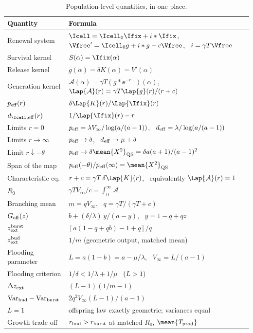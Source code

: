 \begin{table}[htbp]
\centering
\renewcommand{\arraystretch}{1.1}
\small
\begin{tabular}{@{}p{}p{}@{}}
\toprule
Quantity & Formula \\
\midrule
Renewal system & $\Icell=\Icell_0\Ifix+i*\Ifix$, \ $\Vfree'=\Icell_0 g+i*g-c\Vfree$, \ $i=\gamma T\Vfree$ \\
Survival kernel & $S(\alpha)=\Ifix(\alpha)$ \\
Release kernel & $g(\alpha)=\delta K(\alpha)=V'(\alpha)$ \\
Generation kernel & $\mathcal A(\alpha)=\gamma T(g*\ee^{-c\,\cdot})(\alpha)$, \ $\Lap{\mathcal A}(r)=\gamma T\Lap{g}(r)/(r+c)$ \\
$p_{\rm eff}(r)$ & $\delta\Lap{K}(r)/\Lap{\Ifix}(r)$ \\
$d_{\Icell,{\rm eff}}(r)$ & $1/\Lap{\Ifix}(r)-r$ \\
Limits $r=0$ & $p_{\rm eff}=\lambda V_\infty/\log(a/(a-1))$, \ $d_{\rm eff}=\lambda/\log(a/(a-1))$ \\
Limits $r\to\infty$ & $p_{\rm eff}\to\delta$, \ $d_{\rm eff}\to\mu+\delta$ \\
Limit $r\downarrow-\theta$ & $p_{\rm eff}\to\delta\mean{X^2}_{\rm QS}=\delta a(a+1)/(a-1)^2$ \\
Span of the map & $p_{\rm eff}(-\theta)/p_{\rm eff}(\infty)=\mean{X^2}_{\rm QS}$ \\
Characteristic eq. & $r+c=\gamma T\,\delta\Lap{K}(r)$, \ equivalently $\Lap{\mathcal A}(r)=1$ \\
$R_0$ & $\gamma T V_\infty/c=\int_0^\infty\mathcal A$ \\
Branching mean & $m=qV_\infty$, \ $q=\gamma T/(\gamma T+c)$ \\
$G_{\rm off}(z)$ & $b+(\delta/\lambda)\,y/(a-y)$, \ $y=1-q+qz$ \\
$z_{\rm ext}^{\rm burst}$ & $[a(1-q+qb)-1+q]/q$ \\
$z_{\rm ext}^{\rm bud}$ & $1/m$ (geometric output, matched mean) \\
Flooding parameter & $L=a(1-b)=a-\mu/\lambda$, \ $V_\infty=L/(a-1)$ \\
Flooding criterion & $1/\delta<1/\lambda+1/\mu$ \ ($L>1$) \\
$\Delta z_{\rm ext}$ & $(L-1)(1/m-1)$ \\
$\mathrm{Var}_{\rm bud}-\mathrm{Var}_{\rm burst}$ & $2q^2V_\infty(L-1)/(a-1)$ \\
$L=1$ & offspring law exactly geometric; variances equal \\
Growth trade-off & $r_{\rm bud}>r_{\rm burst}$ at matched $R_0$, $\mean{T_{\rm prod}}$ \\
\bottomrule
\end{tabular}
\caption{Population-level quantities, in one place.}
\label{p:tab:formulae}
\end{table}


